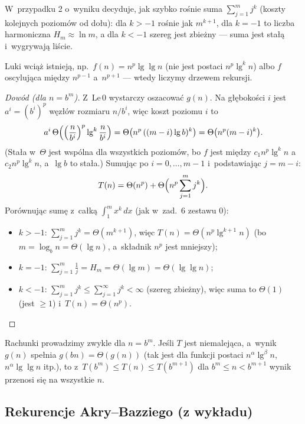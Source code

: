 \documentclass[11pt]{article}
\begin{document}
\begin{intuicja}
W~przypadku 2 o~wyniku decyduje, jak szybko rośnie suma
$\sum_{j=1}^{m}j^k$ (koszty kolejnych poziomów od dołu):
dla $k>-1$ rośnie jak $m^{k+1}$, dla $k=-1$ to liczba harmoniczna $H_m\approx\ln m$,
a dla $k<-1$ szereg jest zbieżny --- suma jest stałą i~wygrywają liście.

Luki wciąż istnieją, np.\ $f(n)=n^p\lg\lg n$ (nie jest postaci $n^p\lg^kn$)
albo $f$ oscylująca między $n^{p-1}$ a~$n^{p+1}$ --- wtedy liczymy drzewem rekursji.
\end{intuicja}

\begin{proof}[Dowód (dla $n=b^m$)]
Z~Le\,0 wystarczy oszacować $g(n)$. Na głębokości $i$ jest $a^i=(b^i)^p$
węzłów rozmiaru $n/b^i$, więc koszt poziomu $i$ to
\[
a^i\,\Theta\Bigl(\Bigl(\frac{n}{b^i}\Bigr)^p\lg^k\frac{n}{b^i}\Bigr)
=\Theta\bigl(n^p\,((m-i)\lg b)^k\bigr)=\Theta\bigl(n^p(m-i)^k\bigr).
\]
(Stała w~$\Theta$ jest wspólna dla wszystkich poziomów, bo $f$ jest między
$c_1n^p\lg^kn$ a~$c_2n^p\lg^kn$, a~$\lg b$ to stała.) Sumując po
$i=0,\dots,m-1$ i~podstawiając $j=m-i$:
\[
T(n)=\Theta(n^p)+\Theta\Bigl(n^p\sum_{j=1}^mj^k\Bigr).
\]
Porównując sumę z~całką $\int_1^m x^k\,dx$ (jak w~zad.~6 zestawu 0):
\begin{itemize}
\item $k>-1$: $\sum_{j=1}^mj^k=\Theta(m^{k+1})$, więc $T(n)=\Theta(n^p\lg^{k+1}n)$
(bo $m=\log_bn=\Theta(\lg n)$, a~składnik $n^p$ jest mniejszy);
\item $k=-1$: $\sum_{j=1}^m\frac1j=H_m=\Theta(\lg m)=\Theta(\lg\lg n)$;
\item $k<-1$: $\sum_{j=1}^m j^k\le\sum_{j=1}^\infty j^k<\infty$ (szereg zbieżny),
więc suma to $\Theta(1)$ (jest $\ge1$) i~$T(n)=\Theta(n^p)$.\qedhere
\end{itemize}
\end{proof}

\begin{uwaga}
Rachunki prowadzimy zwykle dla $n=b^m$. Jeśli $T$ jest niemalejąca, a~wynik
$g(n)$ spełnia $g(bn)=\Theta(g(n))$ (tak jest dla funkcji postaci
$n^\alpha\lg^\beta n$, $n^\alpha\lg\lg n$ itp.), to z~$T(b^m)\le T(n)\le T(b^{m+1})$
dla $b^m\le n<b^{m+1}$ wynik przenosi się na wszystkie $n$.
\end{uwaga}

\subsection*{Rekurencje Akry--Bazziego (z wykładu)}
\end{document}
